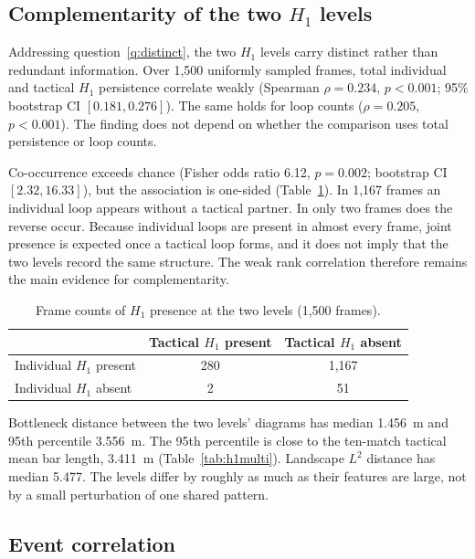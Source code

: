 \subsection{Complementarity of the two \texorpdfstring{$H_1$}{} levels}
\label{sec:complementarity}

Addressing question~\ref{q:distinct}, the two $H_1$ levels carry
distinct rather than redundant information.
Over 1{,}500 uniformly sampled frames, total individual and tactical
$H_1$ persistence correlate weakly (Spearman $\rho=0.234$, $p<0.001$;
95\% bootstrap CI $[0.181, 0.276]$). The same holds for loop counts
($\rho=0.205$, $p<0.001$). The finding does not depend on whether the
comparison uses total persistence or loop counts.

Co-occurrence exceeds chance (Fisher odds ratio 6.12, $p=0.002$;
bootstrap CI $[2.32, 16.33]$), but the association is one-sided
(Table~\ref{tab:fisher}). In 1{,}167 frames an individual loop appears
without a tactical partner. In only two frames does the reverse occur.
Because individual loops are present in almost every frame, joint
presence is expected once a tactical loop forms, and it does not imply
that the two levels record the same structure. The weak rank
correlation therefore remains the main evidence for complementarity.

\begin{table}[h]
\centering
\caption{Frame counts of \texorpdfstring{$H_1$}{} presence at the two levels (1{,}500 frames).}
\label{tab:fisher}
\begin{tabular}{@{}lcc@{}}
\toprule
 & Tactical $H_1$ present & Tactical $H_1$ absent \\
\midrule
Individual $H_1$ present & 280 & 1{,}167 \\
Individual $H_1$ absent  & 2   & 51 \\
\bottomrule
\end{tabular}
\end{table}

Bottleneck distance between the two levels'
diagrams has median 1.456~m and 95th percentile 3.556~m. The
95th percentile is close to the ten-match tactical mean bar length,
3.411~m (Table~\ref{tab:h1multi}). Landscape $L^2$ distance has median 5.477.
The levels differ by roughly as much as their features are large, not
by a small perturbation of one shared pattern.

\subsection{Event correlation}
\label{sec:eventcorr}

